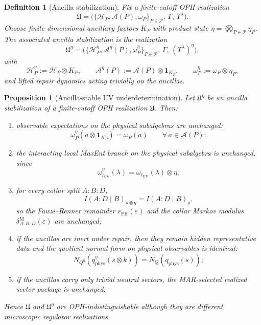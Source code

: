 \documentclass[11pt]{article}
\newtheorem{proposition}[theorem]{Proposition}
\newtheorem{definition}[theorem]{Definition}
\begin{document}
\begin{definition}[Ancilla stabilization]\label{def:ancillastab}
Fix a finite-cutoff OPH realization
\[
\mathfrak U=
\bigl(\{\mathcal H_P,\mathcal A(P),\omega_P\}_{P\in\mathcal P},\,\Gamma,\,T^\lambda\bigr).
\]
Choose finite-dimensional ancillary factors \(K_P\) with product state \(\eta=\bigotimes_{P\in\mathcal P}\eta_P\). The associated ancilla stabilization is the realization
\[
\mathfrak U^\eta=
\bigl(\{\mathcal H_P^\eta,\mathcal A^\eta(P),\omega_P^\eta\}_{P\in\mathcal P},\,\Gamma,\,(T^\lambda)^\eta\bigr),
\]
with
\[
\mathcal H_P^\eta:=\mathcal H_P\otimes K_P,\qquad
\mathcal A^\eta(P):=\mathcal A(P)\otimes \mathbf 1_{K_P},\qquad
\omega_P^\eta:=\omega_P\otimes \eta_P,
\]
and lifted repair dynamics acting trivially on the ancillas.
\end{definition}

\begin{proposition}[Ancilla-stable UV underdetermination]\label{prop:ancillauv}
Let \(\mathfrak U^\eta\) be an ancilla stabilization of a finite-cutoff OPH realization \(\mathfrak U\). Then:
\begin{enumerate}[leftmargin=2em]
\item observable expectations on the physical subalgebras are unchanged:
\[
\omega_P^\eta(a\otimes \mathbf 1_{K_P})=\omega_P(a)
\qquad
\forall\, a\in\mathcal A(P);
\]
\item the interacting local MaxEnt branch on the physical subalgebra is unchanged, since
\[
\omega_{\ell_{\mathrm{UV}}}^\eta(\lambda)=\omega_{\ell_{\mathrm{UV}}}(\lambda)\otimes \eta;
\]
\item for every collar split \(A:B:D\),
\[
I(A:D\mid B)_{\rho\otimes \eta}=I(A:D\mid B)_\rho,
\]
so the Fawzi--Renner remainder \(r_{\mathrm{FR}}(\varepsilon)\) and the collar Markov modulus \(\delta^{\mathrm M}_{A:B:D}(\varepsilon)\) are unchanged;
\item if the ancillas are inert under repair, then they remain hidden representative data and the
quotient normal form on physical observables is identical:
\[
N_{Q^\eta}\!\left(q^\eta_{\mathrm{phys}}(s\otimes k)\right)
=
N_Q\!\left(q_{\mathrm{phys}}(s)\right);
\]
\item if the ancillas carry only trivial neutral sectors, the MAR-selected realized sector package is unchanged.
\end{enumerate}
Hence \(\mathfrak U\) and \(\mathfrak U^\eta\) are OPH-indistinguishable although they are different microscopic regulator realizations.
\end{proposition}
\end{document}
